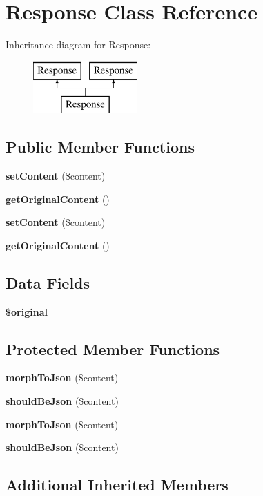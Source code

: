 \section{Response Class Reference}
\label{class_illuminate_1_1_http_1_1_response}
Inheritance diagram for Response\+:\begin{figure}[H]
\begin{center}
\leavevmode
\includegraphics[height=2.000000cm]{class_illuminate_1_1_http_1_1_response}
\end{center}
\end{figure}
\subsection*{Public Member Functions}
\begin{DoxyCompactItemize}
\item 
{\bf set\+Content} (\$content)
\item 
{\bf get\+Original\+Content} ()
\item 
{\bf set\+Content} (\$content)
\item 
{\bf get\+Original\+Content} ()
\end{DoxyCompactItemize}
\subsection*{Data Fields}
\begin{DoxyCompactItemize}
\item 
{\bf \$original}
\end{DoxyCompactItemize}
\subsection*{Protected Member Functions}
\begin{DoxyCompactItemize}
\item 
{\bf morph\+To\+Json} (\$content)
\item 
{\bf should\+Be\+Json} (\$content)
\item 
{\bf morph\+To\+Json} (\$content)
\item 
{\bf should\+Be\+Json} (\$content)
\end{DoxyCompactItemize}
\subsection*{Additional Inherited Members}


